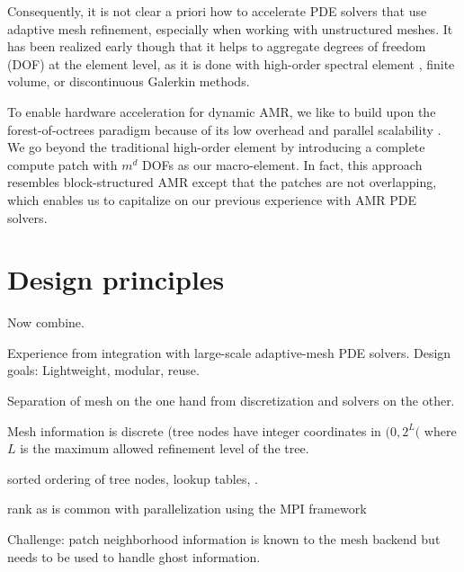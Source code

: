 \documentclass{IOS-Book-Article}     %
\begin{document}
Consequently, it is not clear a priori how to accelerate PDE solvers that use
adaptive mesh refinement, especially when working with unstructured meshes.  It
has been realized early though that it helps to aggregate degrees of freedom
(DOF) at the element level, as it is done with high-order spectral element
\cite{TufoFischer99}, finite volume, or discontinuous Galerkin
\cite{BursteddeGhattasGurnisEtAl10} methods.
%

To enable hardware acceleration for dynamic AMR, we like to build upon the
forest-of-octrees paradigm because of its low overhead and parallel scalability
\cite{BursteddeWilcoxGhattas11}.  We go beyond the traditional high-order
element by introducing a complete compute patch with $m^d$ DOFs as our
macro-element.  In fact, this approach resembles block-structured AMR
\cite{ColellaGravesKeenEtAl07}
except that the patches are not overlapping, which enables us to capitalize on
our previous experience with AMR PDE solvers.

\section*{Design principles}



Now combine.



Experience from integration with large-scale adaptive-mesh PDE solvers.
Design goals: Lightweight, modular, reuse.

Separation of mesh on the one hand from discretization and solvers on the other.

Mesh information is discrete (tree nodes have integer coordinates in
$(0, 2^L($ where $L$ is the maximum allowed refinement level of the tree.

sorted ordering of tree nodes, lookup tables, .



rank as is common with parallelization using the MPI framework

Challenge: patch neighborhood information is known to the mesh backend
but needs to be used to handle ghost information.
\end{document}
